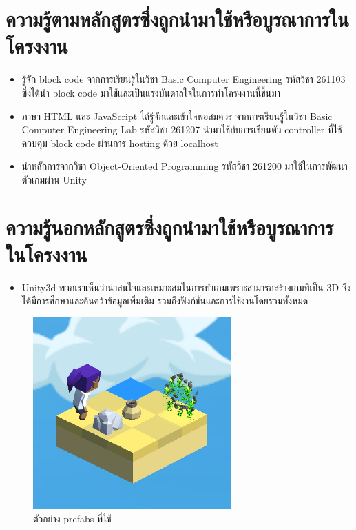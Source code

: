 
\section{ความรู้ตามหลักสูตรซึ่งถูกนำมาใช้หรือบูรณาการในโครงงาน}
\begin{itemize}
  \item รู้จัก block code จากการเรียนรู้ในวิชา Basic Computer Engineering รหัสวิชา 261103 ซึ่งได้นำ block code มาใช้และเป็นแรงบันดาลใจในการทำโครงงานนี้ขึ้นมา
  \item ภาษา HTML และ JavaScript ได้รู้จักและเข้าใจพอสมควร จากการเรียนรู้ในวิชา Basic Computer Engineering Lab รหัสวิชา 261207 นำมาใช้กับการเขียนตัว controller ที่ใช้ควบคุม block code ผ่านการ hosting ด้วย localhost
  \item นำหลักการจากวิชา Object-Oriented Programming รหัสวิชา 261200 มาใช้ในการพัฒนาตัวเกมผ่าน Unity
\end{itemize}

\section{ความรู้นอกหลักสูตรซึ่งถูกนำมาใช้หรือบูรณาการในโครงงาน}
\begin{itemize}
  \item Unity3d พวกเราเห็นว่าน่าสนใจและเหมาะสมในการทำเกมเพราะสามารถสร้างเกมที่เป็น 3D จึงได้มีการศึกษาและค้นคว้าข้อมูลเพิ่มเติม รวมถึงฟังก์ชันและการใช้งานโดยรวมทั้งหมด
\end{itemize}

\begin{figure}[h!]
\begin{center}
\includegraphics{pic/prefabs.png}
\end{center}
\caption[ตัวอย่าง prefabs ที่ใช้]{ตัวอย่าง prefabs ที่ใช้ }
\label{prefabs}
\end{figure}
